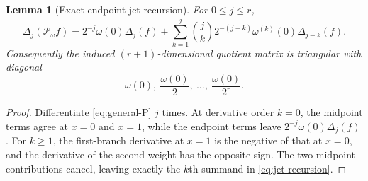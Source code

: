 \documentclass[11pt,a4paper]{article}
\newtheorem{lemma}[theorem]{Lemma}
\theoremstyle{definition}
\theoremstyle{remark}
\newcommand{\Pop}{\mathcal P}
\begin{document}
\begin{lemma}[Exact endpoint-jet recursion]
\label{lem:jet-recursion}
For $0\le j\le r$,
\begin{equation}
 \Delta_j(\Pop_\omega f)
 =2^{-j}\omega(0)\Delta_j(f)
 +\sum_{k=1}^{j}\binom{j}{k}2^{-(j-k)}
   \omega^{(k)}(0)\Delta_{j-k}(f).
 \label{eq:jet-recursion}
\end{equation}
Consequently the induced $(r+1)$-dimensional quotient matrix is triangular
with diagonal
\begin{equation}
 \omega(0),\ \frac{\omega(0)}2,\ \ldots,\ \frac{\omega(0)}{2^r}.
 \label{eq:jet-diagonal}
\end{equation}
\end{lemma}
\begin{proof}
Differentiate \eqref{eq:general-P} $j$ times.  At derivative order $k=0$,
the midpoint terms agree at $x=0$ and $x=1$, while the endpoint terms leave
$2^{-j}\omega(0)\Delta_j(f)$.  For $k\ge1$, the first-branch derivative at
$x=1$ is the negative of that at $x=0$, and the derivative of the second
weight has the opposite sign.  The two midpoint contributions cancel,
leaving exactly the $k$th summand in \eqref{eq:jet-recursion}.
\end{proof}
\end{document}
